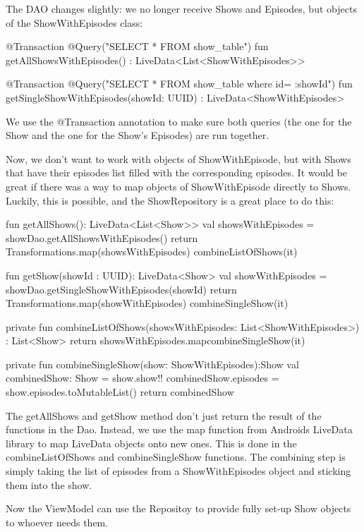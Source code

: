 The DAO changes slightly: we no longer receive Shows and Episodes, but objects of the ShowWithEpisodes class:
\begin{android}
@Transaction
@Query("SELECT * FROM show_table")
fun getAllShowsWithEpisodes() : LiveData<List<ShowWithEpisodes>>

@Transaction
@Query("SELECT * FROM show_table where id= :showId")
fun getSingleShowWithEpisodes(showId: UUID) : LiveData<ShowWithEpisodes>
\end{android}
We use the @Transaction annotation to make sure both queries (the one for the Show and the one for the Show's Episodes) are run together.

Now, we don't want to work with objects of ShowWithEpisode, but with Shows that have their episodes list filled with the corresponding episodes.
It would be great if there was a way to map objects of ShowWithEpisode directly to Shows. 
Luckily, this is possible, and the ShowRepository is a great place to do this:
\begin{android}
fun getAllShows(): LiveData<List<Show>> {
	val showsWithEpisodes = showDao.getAllShowsWithEpisodes()
	return Transformations.map(showsWithEpisodes) {combineListOfShows(it)}
}

fun getShow(showId : UUID): LiveData<Show> {
	val showWithEpisodes = showDao.getSingleShowWithEpisodes(showId)
	return Transformations.map(showWithEpisodes) {combineSingleShow(it)}
}

private fun combineListOfShows(showsWithEpisodes: List<ShowWithEpisodes>) : List<Show> {
	return showsWithEpisodes.map{combineSingleShow(it)}
}

private fun combineSingleShow(show: ShowWithEpisodes):Show {
	val combinedShow: Show = show.show!!
	combinedShow.episodes = show.episodes.toMutableList()
	return combinedShow
}
\end{android}
The getAllShows and getShow method don't just return the result of the functions in the Dao.
Instead, we use the map function from Androids LiveData library to map LiveData objects onto new ones.
This is done in the combineListOfShows and combineSingleShow functions.
The combining step is simply taking the list of episodes from a ShowWithEpisodes object and sticking them into the show.

Now the ViewModel can use the Repositoy to provide fully set-up Show objects to whoever needs them.
